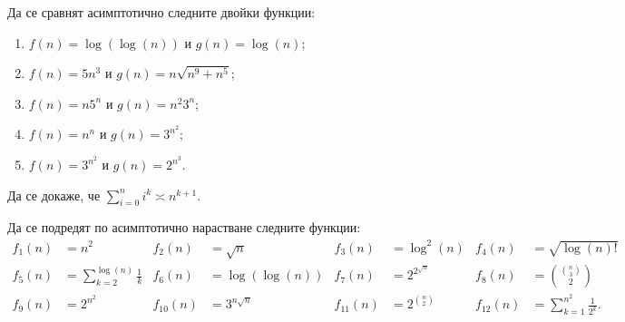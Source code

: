 \begin{problem}
Да се сравнят асимптотично следните двойки функции:
\begin{enumerate}
  \item $f(n) = \log(\log(n))$ и $g(n) = \log(n)$;
  \item $f(n) = 5n^3$ и $g(n) = n \sqrt{n^9 + n^5}$;
  \item $f(n) = n 5^n$ и $g(n) = n^ 2 3^n$;
  \item $f(n) = n^n$ и $g(n) = 3^{n^2}$;
  \item $f(n) = 3^{n^2}$ и $g(n) = 2^{n^3}$.
\end{enumerate}
\end{problem}

\begin{problem}
Да се докаже, че $\sum\limits_{i = 0}^n i^k \asymp n^{k+1}$.
\end{problem}

\begin{problem}
Да се подредят по асимптотично нарастване следните функции:
\begin{align*}
  f_1(n) & = n^2                                       & f_2(n)    & = \sqrt{n}       & f_3(n)    & = \log^2(n)        & f_4(n)    & = \sqrt{\log(n)!}                         \\
  f_5(n) & = \sum\limits_{k = 2}^{\log(n)} \frac{1}{k} & f_6(n)    & = \log(\log(n))  & f_7(n)    & = 2^{2^{\sqrt{n}}} & f_8(n)    & = \binom{\binom{n}{3}}{2}                 \\
  f_9(n) & =2^{n^2}                                    & f_{10}(n) & = 3^{n \sqrt{n}} & f_{11}(n) & =2^{\binom{n}{2}}  & f_{12}(n) & = \sum\limits_{k = 1}^{n^2} \frac{1}{2^k}.
\end{align*}
\end{problem}